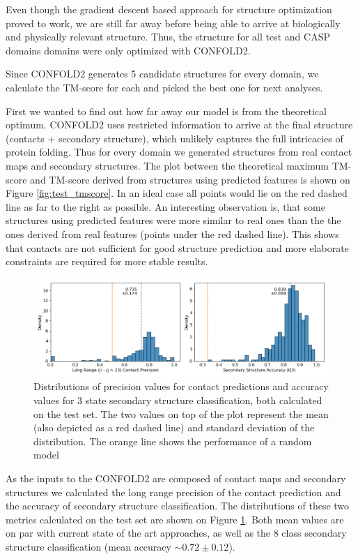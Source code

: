 Even though the gradient descent based approach for structure optimization proved to work, we are still far away before being able to arrive at biologically and physically relevant structure. Thus, the structure for all test and CASP domains domains were only optimized with CONFOLD2. 

Since CONFOLD2 generates 5 candidate structures for every domain, we calculate the TM-score for each and picked the best one for next analyses.

First we wanted to find out how far away our model is from the theoretical optimum. CONFOLD2 uses restricted information to arrive at the final structure (contacts + secondary structure), which unlikely captures the full intricacies of protein folding. Thus for every domain we generated structures from real contact maps and secondary structures. The plot between the theoretical maximum TM-score and TM-score derived from structures using predicted features is shown on Figure \ref{fig:test_tmscore}. In an ideal case all points would lie on the red dashed line as far to the right as possible. 
An interesting observation is, that some structures using predicted features were more similar to real ones than the the ones derived from real features (points under the red dashed line). This shows that contacts are not sufficient for good structure prediction and more elaborate constraints are required for more stable results.

\begin{figure}
    \centering
    \includegraphics[width=\linewidth]{imgs_tomas/long_range_contacts_secondary_eval.png}
    \caption{Distributions of precision values for contact predictions and accuracy values for 3 state secondary structure classification, both calculated on the test set. The two values on top of the plot represent the mean (also depicted as a red dashed line) and standard deviation of the distribution. The orange line shows the performance of a random model}
    \label{fig:contacts_sec}
\end{figure}

As the inputs to the CONFOLD2 are composed of contact maps and secondary structures we calculated the long range precision of the contact prediction and the accuracy of secondary structure classification. The distributions of these two metrics calculated on the test set are shown on Figure \ref{fig:contacts_sec}. Both mean values are on par with current state of the art approaches, as well as the 8 class secondary structure classification (mean accuracy $\sim 0.72 \pm 0.12$).


